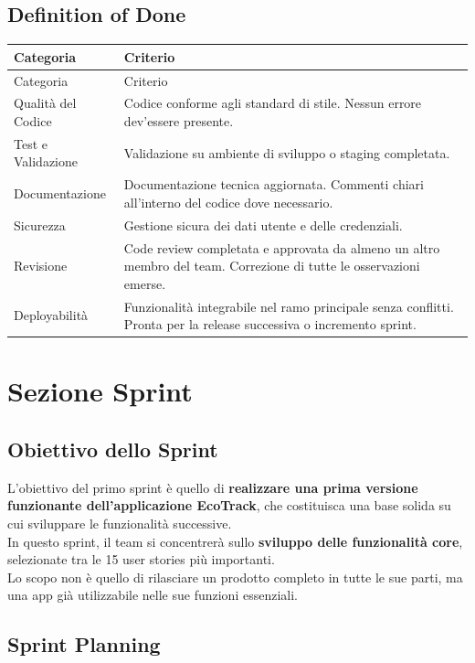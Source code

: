 \subsection{Definition of Done}
\begin{longtable}{p{3cm}p{11cm}}
\toprule
Categoria & Criterio \\
\midrule
\endfirsthead
\toprule
Categoria & Criterio \\
\midrule
\endhead
Qualità del Codice & Codice conforme agli standard di stile. Nessun errore dev'essere presente. \\
Test e Validazione & Validazione su ambiente di sviluppo o staging completata. \\
Documentazione & Documentazione tecnica aggiornata. Commenti chiari all'interno del codice dove necessario. \\
Sicurezza & Gestione sicura dei dati utente e delle credenziali. \\
Revisione & Code review completata e approvata da almeno un altro membro del team. Correzione di tutte le osservazioni emerse. \\
Deployabilità & Funzionalità integrabile nel ramo principale senza conflitti. Pronta per la release successiva o incremento sprint. \\
\bottomrule
\end{longtable}

\section{Sezione Sprint}
\subsection{Obiettivo dello Sprint}
L’obiettivo del primo sprint è quello di \textbf{realizzare una prima versione funzionante dell’applicazione EcoTrack}, che costituisca una base solida su cui sviluppare le funzionalità successive. \\In questo sprint, il team si concentrerà sullo \textbf{sviluppo delle funzionalità core}, selezionate tra le 15 user stories più importanti.
\\Lo scopo non è quello di rilasciare un prodotto completo in tutte le sue parti, ma una app già utilizzabile nelle sue funzioni essenziali.

\subsection{Sprint Planning}
